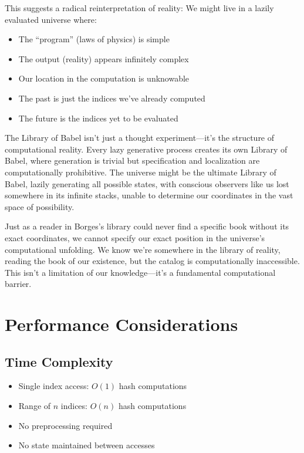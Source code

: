 \documentclass[11pt]{article}
\begin{document}
This suggests a radical reinterpretation of reality: We might live in a lazily evaluated universe where:
\begin{itemize}
\item The ``program'' (laws of physics) is simple
\item The output (reality) appears infinitely complex
\item Our location in the computation is unknowable
\item The past is just the indices we've already computed
\item The future is the indices yet to be evaluated
\end{itemize}

The Library of Babel isn't just a thought experiment---it's the structure of computational reality. Every lazy generative process creates its own Library of Babel, where generation is trivial but specification and localization are computationally prohibitive. The universe might be the ultimate Library of Babel, lazily generating all possible states, with conscious observers like us lost somewhere in its infinite stacks, unable to determine our coordinates in the vast space of possibility.

Just as a reader in Borges's library could never find a specific book without its exact coordinates, we cannot specify our exact position in the universe's computational unfolding. We know we're somewhere in the library of reality, reading the book of our existence, but the catalog is computationally inaccessible. This isn't a limitation of our knowledge---it's a fundamental computational barrier.

\section{Performance Considerations}

\subsection{Time Complexity}

\begin{itemize}
\item Single index access: $O(1)$ hash computations
\item Range of $n$ indices: $O(n)$ hash computations
\item No preprocessing required
\item No state maintained between accesses
\end{itemize}
\end{document}
